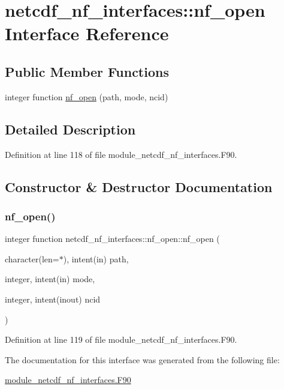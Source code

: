 \hypertarget{interfacenetcdf__nf__interfaces_1_1nf__open}{}\section{netcdf\+\_\+nf\+\_\+interfaces\+:\+:nf\+\_\+open Interface Reference}
\label{interfacenetcdf__nf__interfaces_1_1nf__open}
\subsection*{Public Member Functions}
\begin{DoxyCompactItemize}
\item 
integer function \hyperlink{interfacenetcdf__nf__interfaces_1_1nf__open_ab9b4b9976a8ffe1328966f620ac220d2}{nf\+\_\+open} (path, mode, ncid)
\end{DoxyCompactItemize}


\subsection{Detailed Description}


Definition at line 118 of file module\+\_\+netcdf\+\_\+nf\+\_\+interfaces.\+F90.



\subsection{Constructor \& Destructor Documentation}
\mbox{\label{interfacenetcdf__nf__interfaces_1_1nf__open_ab9b4b9976a8ffe1328966f620ac220d2}} 
\subsubsection{\texorpdfstring{nf\+\_\+open()}{nf\_open()}}
{\footnotesize\ttfamily integer function netcdf\+\_\+nf\+\_\+interfaces\+::nf\+\_\+open\+::nf\+\_\+open (\begin{DoxyParamCaption}\item[{character(len=$\ast$), intent(in)}]{path,  }\item[{integer, intent(in)}]{mode,  }\item[{integer, intent(inout)}]{ncid }\end{DoxyParamCaption})}



Definition at line 119 of file module\+\_\+netcdf\+\_\+nf\+\_\+interfaces.\+F90.



The documentation for this interface was generated from the following file\+:\begin{DoxyCompactItemize}
\item 
\hyperlink{module__netcdf__nf__interfaces_8F90}{module\+\_\+netcdf\+\_\+nf\+\_\+interfaces.\+F90}\end{DoxyCompactItemize}
